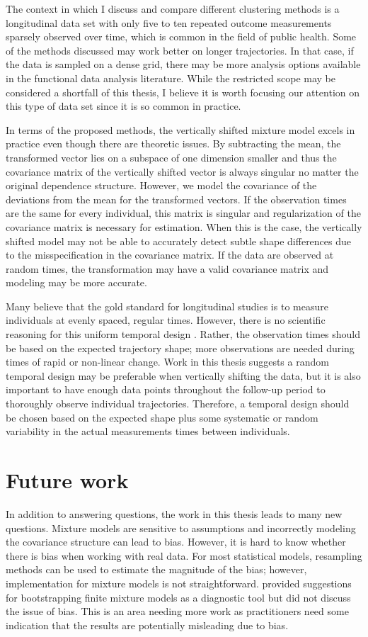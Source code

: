 The context in which I discuss and compare different clustering methods is a longitudinal data set with only five to ten repeated outcome measurements sparsely observed over time, which is common in the field of public health. Some of the methods discussed may work better on longer trajectories. In that case, if the data is sampled on a dense grid, there may be more analysis options available in the functional data analysis literature. While the restricted scope may be considered a shortfall of this thesis, I believe it is worth focusing our attention on this type of data set since it is so common in practice.

In terms of the proposed methods, the vertically shifted mixture model excels in practice even though there are theoretic issues. By subtracting the mean, the transformed vector lies on a subspace of one dimension smaller and thus the covariance matrix of the vertically shifted vector is always singular no matter the original dependence structure. However, we model the covariance of the deviations from the mean for the transformed vectors. If the observation times are the same for every individual, this matrix is singular and regularization of the covariance matrix is necessary for estimation. When this is the case, the vertically shifted model may not be able to accurately detect subtle shape differences due to the misspecification in the covariance matrix. If the data are observed at random times, the transformation may have a valid covariance matrix and modeling may be more accurate. 

Many believe that the gold standard for longitudinal studies is to measure individuals at evenly spaced, regular times. However, there is no scientific reasoning for this uniform temporal design \cite{collins2006}. Rather, the observation times should be based on the expected trajectory shape; more observations are needed during times of rapid or non-linear change. Work in this thesis suggests a random temporal design may be preferable when vertically shifting the data, but it is also important to have enough data points throughout the follow-up period to thoroughly observe individual trajectories. Therefore, a temporal design should be chosen based on the expected shape plus some systematic or random variability in the actual measurements times between individuals. 

\section{Future work}
In addition to answering questions, the work in this thesis leads to many new questions. Mixture models are sensitive to assumptions and incorrectly modeling the covariance structure can lead to bias. However, it is hard to know whether there is bias when working with real data. For most statistical models, resampling methods can be used to estimate the magnitude of the bias; however, implementation for mixture models is not straightforward. \Textcite{grun2004} provided suggestions for bootstrapping finite mixture models as a diagnostic tool but did not discuss the issue of bias. This is an area needing more work as practitioners need some indication that the results are potentially misleading due to bias. 

